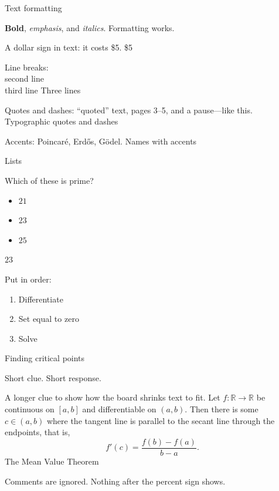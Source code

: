 \documentclass{article}
\newcommand{\R}{\mathbb{R}}
\begin{document}
\begin{category}{Text formatting}
  \begin{clue}
    \textbf{Bold}, \emph{emphasis}, and \textit{italics}.
  \response
    Formatting works.
  \end{clue}
  \begin{clue}
    A dollar sign in text: it costs \$5.
  \response
    \$5
  \end{clue}
  \begin{clue}
    Line breaks:\\ second line\\ third line
  \response
    Three lines
  \end{clue}
  \begin{clue}
    Quotes and dashes: ``quoted'' text, pages 3--5, and a pause---like this.
  \response
    Typographic quotes and dashes
  \end{clue}
  \begin{clue}
    Accents: Poincar\'e, Erd\H{o}s, G\"odel.
  \response
    Names with accents
  \end{clue}
\end{category}

\begin{category}{Lists}
  \begin{clue}
    Which of these is prime?
    \begin{itemize}
      \item $21$
      \item $23$
      \item $25$
    \end{itemize}
  \response
    $23$
  \end{clue}
  \begin{clue}
    Put in order:
    \begin{enumerate}
      \item Differentiate
      \item Set equal to zero
      \item Solve
    \end{enumerate}
  \response
    Finding critical points
  \end{clue}
  \begin{clue}
    Short clue.
  \response
    Short response.
  \end{clue}
  \begin{clue}
    A longer clue to show how the board shrinks text to fit. Let
    $f:\R \to \R$ be continuous on $[a,b]$ and differentiable on $(a,b)$.
    Then there is some $c \in (a,b)$ where the tangent line is parallel
    to the secant line through the endpoints, that is,
    \[ f'(c) = \frac{f(b) - f(a)}{b - a}. \]
  \response
    The Mean Value Theorem
  \end{clue}
  \begin{clue}
    Comments are ignored. %
  \response
    Nothing after the percent sign shows.
  \end{clue}
\end{category}
\end{document}
